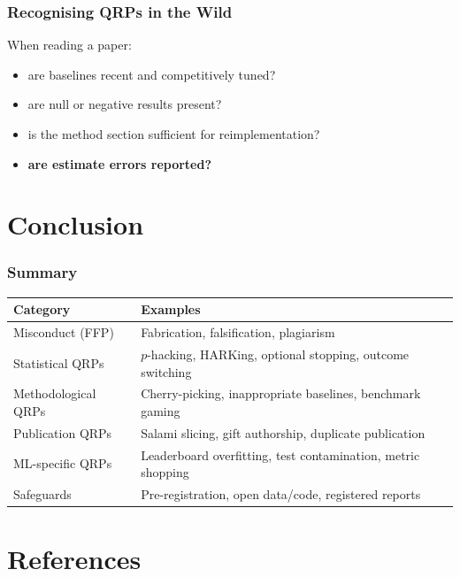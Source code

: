 \documentclass[]{beamer}
\begin{document}
\begin{frame}[fragile]
\frametitle{Recognising QRPs in the Wild}
When reading a paper:
\begin{itemize}
  \item are baselines recent and competitively tuned?
  \item are null or negative results present?
  \item is the method section sufficient for reimplementation?
  \item \textbf{are estimate errors reported?}
\end{itemize}

\end{frame}

\section{Conclusion}

\begin{frame}[fragile]
\frametitle{Summary}
{\footnotesize
\begin{tabular}{p{3.5cm} p{6cm}}
\toprule
\textbf{Category} & \textbf{Examples} \\
\midrule
Misconduct (FFP) & Fabrication, falsification, plagiarism \\
\addlinespace
Statistical QRPs & $p$-hacking, HARKing, optional stopping, outcome switching \\
\addlinespace
Methodological QRPs & Cherry-picking, inappropriate baselines, benchmark gaming \\
\addlinespace
Publication QRPs & Salami slicing, gift authorship, duplicate publication \\
\addlinespace
ML-specific QRPs & Leaderboard overfitting, test contamination, metric shopping \\
\midrule
Safeguards & Pre-registration, open data/code, registered reports \\
\bottomrule
\end{tabular}
}

\end{frame}

\section{References}
\end{document}
